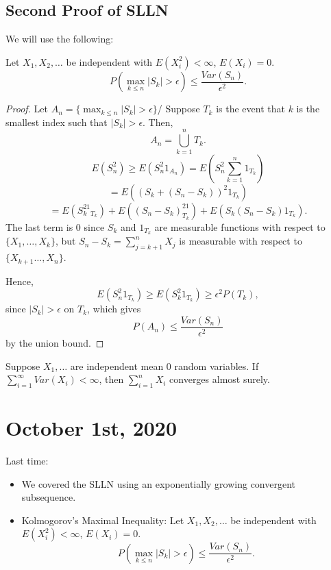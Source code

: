 \documentclass[11pt]{scrartcl}
\begin{document}
\subsection{Second Proof of SLLN}
We will use the following:
\begin{thm} Let $X_1, X_2, \dots$ be independent with $E(X_i^2) < \infty$, $E(X_i) = 0$.  
$$P(\max_{k \le n} |S_k| > \epsilon) \le \frac{Var(S_n)}{\epsilon^2}.$$
\end{thm}
\begin{proof}
Let $A_n = \{\max_{k \le n} |S_k| > \epsilon\}$/  Suppose $T_k$ is the event that $k$ is the smallest index such that $|S_k| > \epsilon$.  Then, $$A_n = \bigcup_{k=1}^n T_k.$$
$$E(S_n^2) \ge E(S_n^2 1_{A_n}) = E(S_n^2 \sum_{k=1}^n 1_{T_k})$$
$$ = E((S_k + (S_n - S_k))^2 1_{T_k})$$
$$ = E(S_k^21_{T_k}) + E((S_n-S_k)^21_{T_k}) + E(S_k(S_n - S_k)1_{T_k}).$$
The last term is $0$ since $S_k$ and $1_{T_k}$ are measurable functions with respect to $\{X_1, \dots, X_k\}$, but $S_n - S_k = \sum_{j=k+1}^n X_j$ is measurable with respect to $\{X_{k+1} \dots, X_{n}\}$.  

Hence,
$$E(S_n^2 1_{T_k}) \ge E(S_k^2 1_{T_k}) \ge \epsilon^2 P(T_k),$$
since $|S_k| > \epsilon$ on $T_k$,
which gives $$P(A_n) \le \frac{Var(S_n)}{\epsilon^2}$$
by the union bound.
\end{proof}
\begin{thm} Suppose $X_1, \dots$ are independent mean 0 random variables.  If $\sum_{i=1}^{\infty} Var(X_i) < \infty$, then $\sum_{i=1}^n X_i$ converges almost surely.
\end{thm}
\pagebreak
\section{October 1st, 2020}
Last time:
\begin{itemize}
\item We covered the SLLN using an exponentially growing convergent subsequence.
\item Kolmogorov's Maximal Inequality:  Let $X_1, X_2, \dots$ be independent with $E(X_i^2) < \infty$, $E(X_i) = 0$.  
$$P(\max_{k \le n} |S_k| > \epsilon) \le \frac{Var(S_n)}{\epsilon^2}.$$
\end{itemize}
\end{document}
